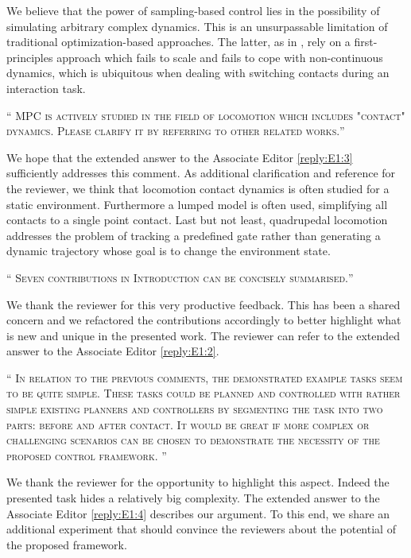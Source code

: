 \documentclass[10pt]{article}
\newcommand{\referee}[1]{\;
  \begin{minipage}[t]{.95\textwidth}
    ``{\small\color{red} \textsc{#1}}''
  \end{minipage}\medskip
  }
\begin{document}
\begin{enumerate}[label={[R2:\,\arabic{enumi}]}]
We believe that the power of sampling-based control lies in the possibility of simulating arbitrary complex dynamics. This is an unsurpassable limitation of traditional optimization-based approaches. The latter, as in \cite{minniti2019whole}, rely on a first-principles approach which fails to scale and fails to cope with non-continuous dynamics, which is ubiquitous when dealing with switching contacts during an interaction task. 

\item\label{reply:R2:7} 
\referee{MPC is actively studied in the field of locomotion which includes "contact" dynamics. Please clarify it by referring to other related works.}

We hope that the extended answer to the Associate Editor \ref{reply:E1:3} sufficiently addresses this comment.  As additional clarification and reference for the reviewer, we think that locomotion contact dynamics is often studied for a static environment. Furthermore a lumped model is often used, simplifying all contacts to a single point contact. Last but not least, quadrupedal locomotion addresses the problem of tracking a predefined gate rather than generating a dynamic trajectory whose goal is to change the environment state.

\item\label{reply:R2:8} 
\referee{Seven contributions in Introduction can be concisely summarised.}

We thank the reviewer for this very productive feedback. This has been a shared concern and we refactored the contributions accordingly to better highlight what is new and unique in the presented work. The reviewer can refer to the extended answer to the Associate Editor \ref{reply:E1:2}.

\item\label{reply:R2:9} 
\referee{In relation to the previous comments, the demonstrated example tasks seem to be quite simple. These tasks could be planned and controlled with rather simple existing planners and controllers by segmenting the task into two parts: before and after contact. It would be great if more complex or challenging scenarios can be chosen to demonstrate the necessity of the proposed control framework. }

We thank the reviewer for the opportunity to highlight this aspect. Indeed the presented task hides a relatively big complexity. The extended answer to the Associate Editor \ref{reply:E1:4} describes our argument. To this end, we share an additional experiment that should convince the reviewers about the potential of the proposed framework.



\end{enumerate}
\end{document}
